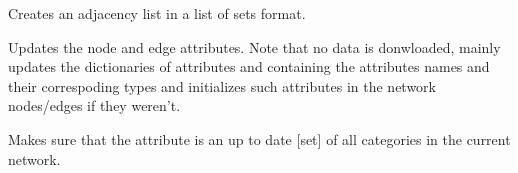 \documentclass[letterpaper,10pt,english]{sphinxmanual}
\begin{document}
\begin{fulllineitems}
\begin{fulllineitems}
\label{\detokenize{main:pypath.main.PyPath.up_stimulates}}
\end{fulllineitems}


\begin{fulllineitems}
\label{\detokenize{main:pypath.main.PyPath.update_adjlist}}
Creates an adjacency list in a list of sets format.

\end{fulllineitems}


\begin{fulllineitems}
\label{\detokenize{main:pypath.main.PyPath.update_attrs}}
Updates the node and edge attributes. Note that no data is
donwloaded, mainly updates the dictionaries of attributes
 and
 containing the
attributes names and their correspoding types and initializes
such attributes in the network nodes/edges if they weren’t.

\end{fulllineitems}


\begin{fulllineitems}
\label{\detokenize{main:pypath.main.PyPath.update_cats}}
Makes sure that the 
attribute is an up to date {[}set{]} of all categories in the
current network.

\end{fulllineitems}


\begin{fulllineitems}
\label{\detokenize{main:pypath.main.PyPath.update_db_dict}}
\end{fulllineitems}


\end{fulllineitems}
\end{document}
